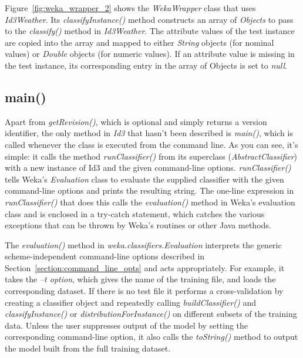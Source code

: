 Figure~\ref{fig:weka_wrapper_2} shows the \textit{WekaWrapper} class
that uses \textit{Id3Weather}. Its \textit{classifyInstance()} method
constructs an array of \textit{Objects} to pass to
the \textit{classify()} method in \textit{Id3Weather}. The attribute
values of the test instance are copied into the array and mapped to
either \textit{String} objects (for nominal values) or \textit{Double}
objects (for numeric values). If an attribute value is missing in the
test instance, its corresponding entry in the array of Objects is set
to \textit{null}.

\subsection{main()}

Apart from \textit{getRevision()}, which is optional and simply returns a
version identifier, the only method in \textit{Id3} that hasn’t been described
is \textit{main()}, which is called whenever the class is executed from the
command line. As you can see, it's simple: it calls the method
\textit{runClassifier()} from its superclass (\textit{AbstractClassifier}) with a new instance
of Id3 and the given command-line options. \textit{runClassifier()} tells
Weka's \textit{Evaluation} class to evaluate the supplied classifier with the
given command-line options and prints the resulting string. The
one-line expression in \textit{runClassifier()} that does this calls the
\textit{evaluation()} method in Weka's evaluation class and is enclosed in a
try-catch statement, which catches the various exceptions that can be
thrown by Weka's routines or other Java methods.

The \textit{evaluation()} method
in \textit{weka.classifiers.Evaluation} interprets the generic
scheme-independent command-line options described in
Section~\ref{section:command_line_opts} and acts appropriately. For
example, it takes the \textit{--t option}, which gives the name of the training
file, and loads the corresponding dataset. If there is no test file it
performs a cross-validation by creating a classifier object and
repeatedly calling \textit{buildClassifier()} and \textit{classifyInstance()} or
\textit{distributionForInstance()} on different subsets of the training
data. Unless the user suppresses output of the model by setting the
corresponding command-line option, it also calls
the \textit{toString()} method to output the model built from the full
training dataset.

